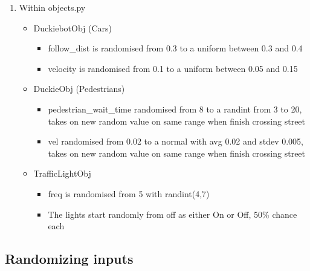 \begin{enumerate}
\begin{itemize}
    \end{itemize}
    \item Within objects.py
    \begin{itemize}
        \item DuckiebotObj (Cars)
        \begin{itemize}
            \item follow\_dist is randomised from 0.3 to a uniform between 0.3 and 0.4
            \item velocity is randomised from 0.1 to a uniform between 0.05 and 0.15
        \end{itemize}
        \item DuckieObj (Pedestrians)
        \begin{itemize}
            \item pedestrian\_wait\_time randomised from 8 to a randint from 3 to 20, takes on new random value on same range when finish crossing street
            \item vel randomised from 0.02 to a normal with avg 0.02 and stdev 0.005, takes on new random value on same range when finish crossing street
        \end{itemize}
        \item TrafficLightObj
        \begin{itemize}
            \item freq is randomised from 5 with randint(4,7)
            \item The lights start randomly from off as either On or Off, 50\% chance each
        \end{itemize}
    \end{itemize}
\end{enumerate}


\subsection{Randomizing inputs}


